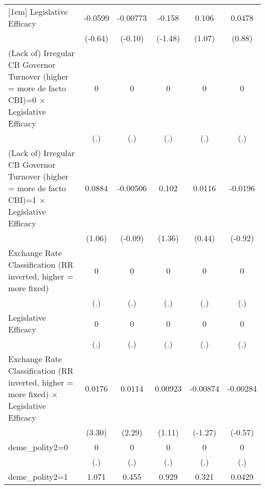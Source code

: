 {\begin{tabular*}{\linewidth}{@{\hskip\tabcolsep\extracolsep\fill}l*{5}{c}}
[1em]
Legislative Efficacy&  -0.0599         & -0.00773         &   -0.158         &    0.106         &   0.0478         \\
                &  (-0.64)         &  (-0.10)         &  (-1.48)         &   (1.07)         &   (0.88)         \\
[1em]
(Lack of) Irregular CB Governor Turnover (higher = more de facto CBI)=0 $\times$ Legislative Efficacy&        0         &        0         &        0         &        0         &        0         \\
                &      (.)         &      (.)         &      (.)         &      (.)         &      (.)         \\
[1em]
(Lack of) Irregular CB Governor Turnover (higher = more de facto CBI)=1 $\times$ Legislative Efficacy&   0.0884         & -0.00506         &    0.102         &   0.0116         &  -0.0196         \\
                &   (1.06)         &  (-0.09)         &   (1.36)         &   (0.44)         &  (-0.92)         \\
[1em]
Exchange Rate Classification (RR inverted, higher = more fixed)&        0         &        0         &        0         &        0         &        0         \\
                &      (.)         &      (.)         &      (.)         &      (.)         &      (.)         \\
[1em]
Legislative Efficacy&        0         &        0         &        0         &        0         &        0         \\
                &      (.)         &      (.)         &      (.)         &      (.)         &      (.)         \\
[1em]
Exchange Rate Classification (RR inverted, higher = more fixed) $\times$ Legislative Efficacy&   0.0176\sym{**} &   0.0114\sym{*}  &  0.00923         & -0.00874         & -0.00284         \\
                &   (3.30)         &   (2.29)         &   (1.11)         &  (-1.27)         &  (-0.57)         \\
[1em]
deme\_polity2=0  &        0         &        0         &        0         &        0         &        0         \\
                &      (.)         &      (.)         &      (.)         &      (.)         &      (.)         \\
[1em]
deme\_polity2=1  &    1.071\sym{***}&    0.455\sym{**} &    0.929\sym{***}&    0.321         &   0.0429         \\

\end{tabular*}}

